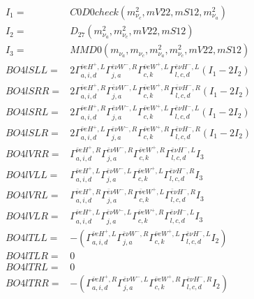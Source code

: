 \documentclass[A4,landscape]{article}
\begin{document}
\begin{align} 
I_1 = & C0D0check(m^2_{\nu_{{c}}}, mV22, mS12, m^2_{\nu_{{a}}}) \\ 
I_2 = & D_{27}(m^2_{\nu_{{a}}}, m^2_{\nu_{{c}}}, mV22, mS12) \\ 
I_3 = & MMD0(m_{\nu_{{a}}}, m_{\nu_{{c}}}, m^2_{\nu_{{a}}}, m^2_{\nu_{{c}}}, mV22, mS12) \\ 
  BO4lSLL= & 2  \Gamma^{\bar{\nu}e H^+,L}_{a, i, d} \Gamma^{\bar{e}\nu W^- ,R}_{j, a} \Gamma^{\bar{\nu}e W^+,L}_{c, k} \Gamma^{\bar{e}\nu H^- ,L}_{l, c, d} (I_1 - 2 I_2) \\ 
  BO4lSRR= & 2  \Gamma^{\bar{\nu}e H^+,R}_{a, i, d} \Gamma^{\bar{e}\nu W^- ,L}_{j, a} \Gamma^{\bar{\nu}e W^+,R}_{c, k} \Gamma^{\bar{e}\nu H^- ,R}_{l, c, d} (I_1 - 2 I_2) \\ 
  BO4lSRL= & 2  \Gamma^{\bar{\nu}e H^+,R}_{a, i, d} \Gamma^{\bar{e}\nu W^- ,L}_{j, a} \Gamma^{\bar{\nu}e W^+,L}_{c, k} \Gamma^{\bar{e}\nu H^- ,L}_{l, c, d} (I_1 - 2 I_2) \\ 
  BO4lSLR= & 2  \Gamma^{\bar{\nu}e H^+,L}_{a, i, d} \Gamma^{\bar{e}\nu W^- ,R}_{j, a} \Gamma^{\bar{\nu}e W^+,R}_{c, k} \Gamma^{\bar{e}\nu H^- ,R}_{l, c, d} (I_1 - 2 I_2) \\ 
  BO4lVRR= &  \Gamma^{\bar{\nu}e H^+,R}_{a, i, d} \Gamma^{\bar{e}\nu W^- ,R}_{j, a} \Gamma^{\bar{\nu}e W^+,R}_{c, k} \Gamma^{\bar{e}\nu H^- ,L}_{l, c, d} I_3 \\ 
  BO4lVLL= &  \Gamma^{\bar{\nu}e H^+,L}_{a, i, d} \Gamma^{\bar{e}\nu W^- ,L}_{j, a} \Gamma^{\bar{\nu}e W^+,L}_{c, k} \Gamma^{\bar{e}\nu H^- ,R}_{l, c, d} I_3 \\ 
  BO4lVRL= &  \Gamma^{\bar{\nu}e H^+,R}_{a, i, d} \Gamma^{\bar{e}\nu W^- ,R}_{j, a} \Gamma^{\bar{\nu}e W^+,L}_{c, k} \Gamma^{\bar{e}\nu H^- ,R}_{l, c, d} I_3 \\ 
  BO4lVLR= &  \Gamma^{\bar{\nu}e H^+,L}_{a, i, d} \Gamma^{\bar{e}\nu W^- ,L}_{j, a} \Gamma^{\bar{\nu}e W^+,R}_{c, k} \Gamma^{\bar{e}\nu H^- ,L}_{l, c, d} I_3 \\ 
  BO4lTLL= & -( \Gamma^{\bar{\nu}e H^+,L}_{a, i, d} \Gamma^{\bar{e}\nu W^- ,R}_{j, a} \Gamma^{\bar{\nu}e W^+,L}_{c, k} \Gamma^{\bar{e}\nu H^- ,L}_{l, c, d} I_2) \\ 
  BO4lTLR= & 0 \\ 
  BO4lTRL= & 0 \\ 
  BO4lTRR= & -( \Gamma^{\bar{\nu}e H^+,R}_{a, i, d} \Gamma^{\bar{e}\nu W^- ,L}_{j, a} \Gamma^{\bar{\nu}e W^+,R}_{c, k} \Gamma^{\bar{e}\nu H^- ,R}_{l, c, d} I_2) \\ 
\end{align} 
\end{document}
